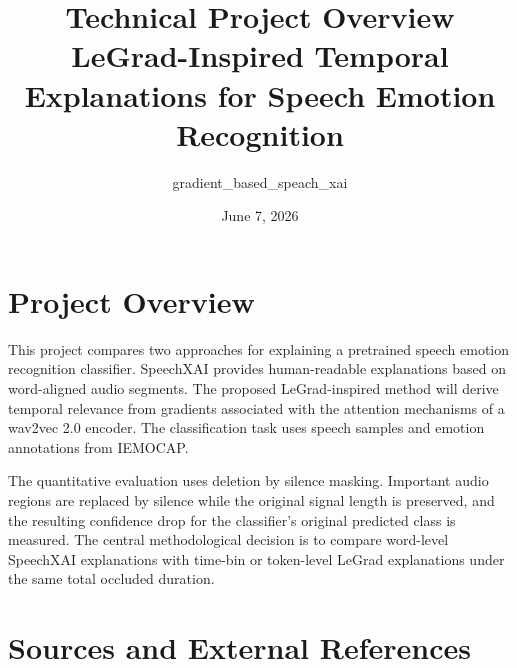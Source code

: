 \documentclass[11pt]{article}
\title{Technical Project Overview\\
\large LeGrad-Inspired Temporal Explanations for Speech Emotion Recognition}
\author{gradient\_based\_speach\_xai}
\date{June 7, 2026}
\begin{document}
\maketitle

\section{Project Overview}

This project compares two approaches for explaining a pretrained speech emotion recognition classifier. SpeechXAI provides human-readable explanations based on word-aligned audio segments. The proposed LeGrad-inspired method will derive temporal relevance from gradients associated with the attention mechanisms of a wav2vec 2.0 encoder. The classification task uses speech samples and emotion annotations from IEMOCAP.

The quantitative evaluation uses deletion by silence masking. Important audio regions are replaced by silence while the original signal length is preserved, and the resulting confidence drop for the classifier's original predicted class is measured. The central methodological decision is to compare word-level SpeechXAI explanations with time-bin or token-level LeGrad explanations under the same total occluded duration.

\section{Sources and External References}
\end{document}
